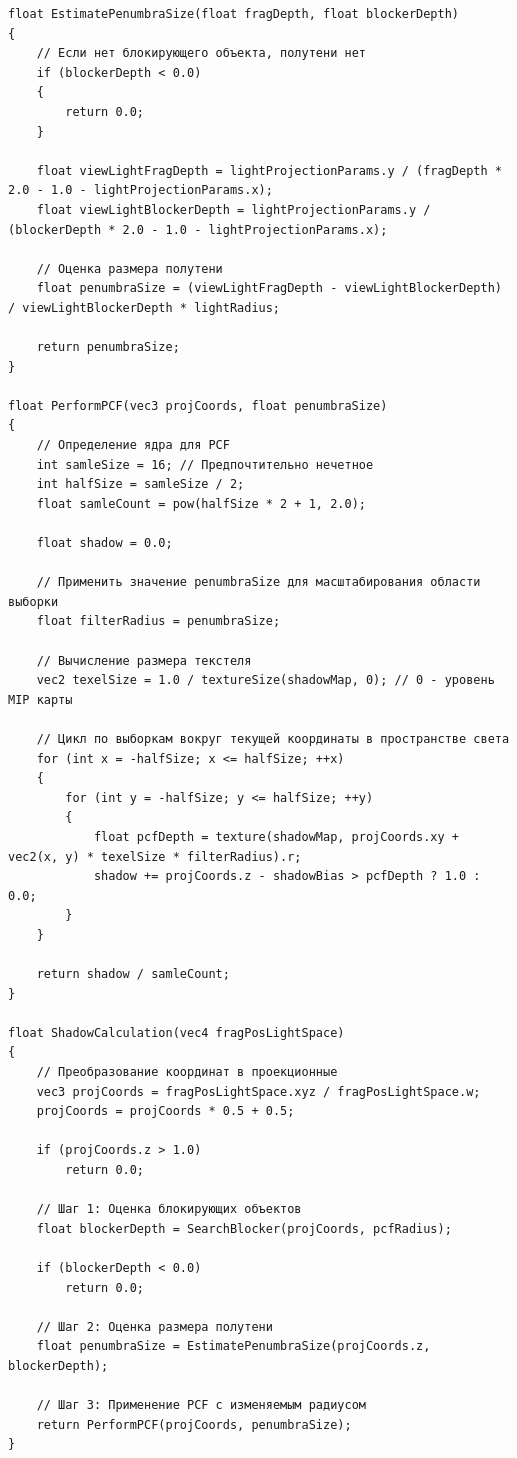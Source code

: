 \begin{center}
\begin{lstlisting}[label=lst:shadow_map_pcss_frag, caption=Фрагментный шейдер с учетом перспективного проецирония теней]
float EstimatePenumbraSize(float fragDepth, float blockerDepth)
{
    // Если нет блокирующего объекта, полутени нет
    if (blockerDepth < 0.0)
    {
        return 0.0;
    }

    float viewLightFragDepth = lightProjectionParams.y / (fragDepth * 2.0 - 1.0 - lightProjectionParams.x);
    float viewLightBlockerDepth = lightProjectionParams.y / (blockerDepth * 2.0 - 1.0 - lightProjectionParams.x);

    // Оценка размера полутени
    float penumbraSize = (viewLightFragDepth - viewLightBlockerDepth) / viewLightBlockerDepth * lightRadius;

    return penumbraSize;
}

float PerformPCF(vec3 projCoords, float penumbraSize)
{
    // Определение ядра для PCF
    int samleSize = 16; // Предпочтительно нечетное
    int halfSize = samleSize / 2;
    float samleCount = pow(halfSize * 2 + 1, 2.0);

    float shadow = 0.0;
    
    // Применить значение penumbraSize для масштабирования области выборки
    float filterRadius = penumbraSize;

    // Вычисление размера текстеля
    vec2 texelSize = 1.0 / textureSize(shadowMap, 0); // 0 - уровень MIP карты

    // Цикл по выборкам вокруг текущей координаты в пространстве света
    for (int x = -halfSize; x <= halfSize; ++x)
    {
        for (int y = -halfSize; y <= halfSize; ++y)
        {
            float pcfDepth = texture(shadowMap, projCoords.xy + vec2(x, y) * texelSize * filterRadius).r;
            shadow += projCoords.z - shadowBias > pcfDepth ? 1.0 : 0.0;
        }
    }

    return shadow / samleCount;
}

float ShadowCalculation(vec4 fragPosLightSpace)
{
    // Преобразование координат в проекционные
    vec3 projCoords = fragPosLightSpace.xyz / fragPosLightSpace.w;
    projCoords = projCoords * 0.5 + 0.5;

    if (projCoords.z > 1.0)
        return 0.0;

    // Шаг 1: Оценка блокирующих объектов
    float blockerDepth = SearchBlocker(projCoords, pcfRadius);

    if (blockerDepth < 0.0)
        return 0.0;

    // Шаг 2: Оценка размера полутени
    float penumbraSize = EstimatePenumbraSize(projCoords.z, blockerDepth);

    // Шаг 3: Применение PCF с изменяемым радиусом
    return PerformPCF(projCoords, penumbraSize);
}


\end{lstlisting}
\end{center}

